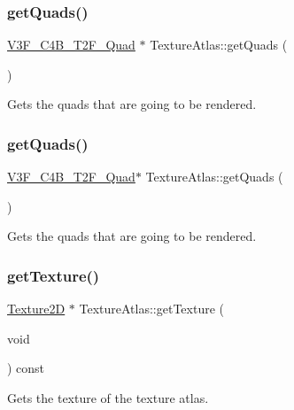 \subsubsection{\texorpdfstring{get\+Quads()}{getQuads()}\hspace{0.1cm}{\footnotesize\ttfamily [1/2]}}
{\footnotesize\ttfamily \hyperlink{structV3F__C4B__T2F__Quad}{V3\+F\+\_\+\+C4\+B\+\_\+\+T2\+F\+\_\+\+Quad} $\ast$ Texture\+Atlas\+::get\+Quads (\begin{DoxyParamCaption}{ }\end{DoxyParamCaption})}

Gets the quads that are going to be rendered. \mbox{\label{classTextureAtlas_ab8e5fd41b1bdfe951eeb40b3be7de50c}} 
\subsubsection{\texorpdfstring{get\+Quads()}{getQuads()}\hspace{0.1cm}{\footnotesize\ttfamily [2/2]}}
{\footnotesize\ttfamily \hyperlink{structV3F__C4B__T2F__Quad}{V3\+F\+\_\+\+C4\+B\+\_\+\+T2\+F\+\_\+\+Quad}$\ast$ Texture\+Atlas\+::get\+Quads (\begin{DoxyParamCaption}{ }\end{DoxyParamCaption})}

Gets the quads that are going to be rendered. \mbox{\label{classTextureAtlas_a03a776c2fefd92b7f3ed289ffe1a6254}} 
\subsubsection{\texorpdfstring{get\+Texture()}{getTexture()}\hspace{0.1cm}{\footnotesize\ttfamily [1/2]}}
{\footnotesize\ttfamily \hyperlink{classTexture2D}{Texture2D} $\ast$ Texture\+Atlas\+::get\+Texture (\begin{DoxyParamCaption}\item[{void}]{ }\end{DoxyParamCaption}) const}

Gets the texture of the texture atlas. \mbox{\label{classTextureAtlas_ac2ada75c4c982218c699fa3b97904d95}} 
